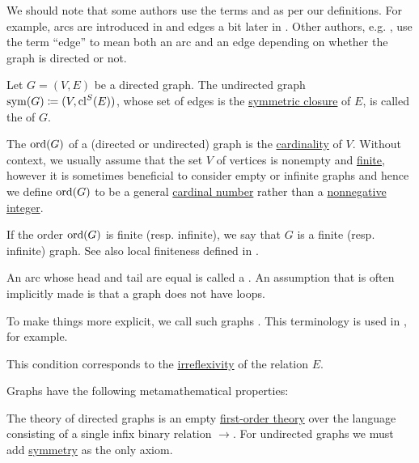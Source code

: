 \begin{definition}
\begin{thmenum}[series=def:graph]
    We should note that some authors use the terms  and  as per our definitions. For example, arcs are introduced in \cite[ch. 1, sec. 1.1]{GondranMinoux1984Graphs} and edges a bit later in \cite[ch. 1, sec. 1.3]{GondranMinoux1984Graphs}. Other authors, e.g. \cite[sec. 5.2]{Erickson2019}, use the term \enquote{edge} to mean both an arc and an edge depending on whether the graph is directed or not.

     Let \( G = (V, E) \) be a directed graph. The undirected graph \( \operatorname{sym}(G) \coloneqq (V, \operatorname{cl}^S(E)) \), whose set of edges is the \hyperref[def:relation_closures/symmetric]{symmetric closure} of \( E \), is called the  of \( G \).

     The  \( \operatorname{ord}(G) \) of a (directed or undirected) graph is the \hyperref[thm:cardinality_existence]{cardinality} of \( V \). Without context, we usually assume that the set \( V \) of vertices is nonempty and \hyperref[def:set_finiteness]{finite}, however it is sometimes beneficial to consider empty or infinite graphs and hence we define \( \operatorname{ord}(G) \) to be a general \hyperref[def:cardinal]{cardinal number} rather than a \hyperref[rem:peano_arithmetic_zero/nonnegative]{nonnegative integer}.

    If the order \( \operatorname{ord}(G) \) is finite (resp. infinite), we say that \( G \) is a finite (resp. infinite) graph. See also local finiteness defined in .

     An arc whose head and tail are equal is called a . An assumption that is often implicitly made is that a graph does not have loops.

    To make things more explicit, we call such graphs . This terminology is used in , for example.

    This condition corresponds to the \hyperref[def:binary_relation/irreflexive]{irreflexivity} of the relation \( E \).
  \end{thmenum}

  Graphs have the following metamathematical properties:
  \begin{thmenum}[resume=def:graph]
     The theory of directed graphs is an empty \hyperref[def:first_order_theory]{first-order theory} over the language consisting of a single infix binary relation \( \to \). For undirected graphs we must add \hyperref[def:binary_relation/symmetric]{symmetry} as the only axiom.


\end{thmenum}
\end{definition}
